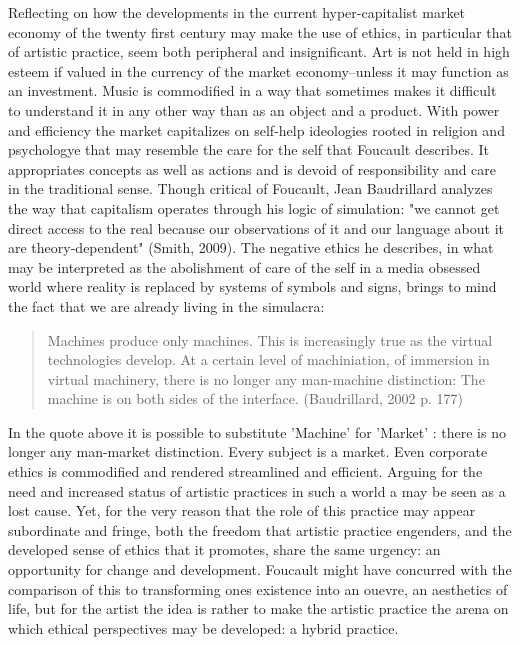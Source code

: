 \documentclass[11pt]{article}
\makeatletter
\newcommand{\citeprocitem}[2]{\hyper@linkstart{cite}{citeproc_bib_item_#1}#2\hyper@linkend}
\makeatother
\begin{document}
Reflecting on how the developments in the current hyper-capitalist market economy of the twenty first century may make the use of ethics, in particular that of artistic practice, seem both peripheral and insignificant. Art is not held in high esteem if valued in the currency of the market economy--unless it may function as an investment. Music is commodified in a way that sometimes makes it difficult to understand it in any other way than as an object and a product. With power and efficiency the market capitalizes on self-help ideologies rooted in religion and psychologye that may resemble the care for the self that Foucault describes. It appropriates concepts as well as actions and is devoid of responsibility and care in the traditional sense. Though critical of Foucault, Jean Baudrillard analyzes the way that capitalism operates through his logic of simulation: "we cannot get direct access to the real because our observations of it and our language about it are theory-dependent" (\citeprocitem{18}{Smith, 2009}). The negative ethics he describes, in what may be interpreted as the abolishment of care of the self in a media obsessed world where reality is replaced by systems of symbols and signs, brings to mind the fact that we are already living in the simulacra:
\begin{quote}
Machines produce only machines. This is increasingly true as the virtual technologies develop. At a certain level of machiniation, of immersion in virtual machinery, there is no longer any man-machine distinction: The machine is on both sides of the interface. (\citeprocitem{1}{Baudrillard, 2002} p. 177)
\end{quote}
In the quote above it is possible to substitute 'Machine' for 'Market' : there is no longer any man-market distinction. Every subject is a market. Even corporate ethics is commodified and rendered streamlined and efficient. Arguing for the need and increased status of artistic practices in such a world a may be seen as a lost cause. Yet, for the very reason that the role of this practice may appear subordinate and fringe, both the freedom that artistic practice engenders, and the developed sense of ethics that it promotes, share the same urgency: an opportunity for change and development. Foucault might have concurred with the comparison of this to transforming ones existence into an ouevre, an aesthetics of life, but for the artist the idea is rather to make the artistic practice the arena on which ethical perspectives may be developed: a hybrid practice.
\end{document}
